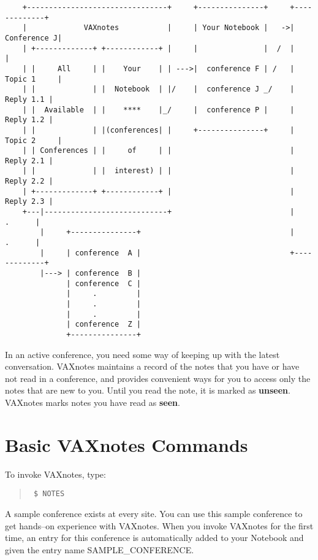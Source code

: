 \begin{verbatim}



    +--------------------------------+     +---------------+     +-------------+
    |             VAXnotes           |     | Your Notebook |   ->| Conference J|
    | +-------------+ +------------+ |     |               |  /  |             |
    | |     All     | |    Your    | | --->|  conference F | /   | Topic 1     |
    | |             | |  Notebook  | |/    |  conference J _/    |   Reply 1.1 |
    | |  Available  | |    ****    |_/     |  conference P |     |   Reply 1.2 |
    | |             | |(conferences| |     +---------------+     | Topic 2     |
    | | Conferences | |     of     | |                           |   Reply 2.1 |
    | |             | |  interest) | |                           |   Reply 2.2 |
    | +-------------+ +------------+ |                           |   Reply 2.3 |
    +---|----------------------------+                           |      .      |
        |     +---------------+                                  |      .      |
        |     | conference  A |                                  +-------------+
        |---> | conference  B |
              | conference  C |
              |     .         |
              |     .         |
              |     .         |
              | conference  Z |
              +---------------+

\end{verbatim}

In an active conference, you need some way of keeping up with the latest
conversation. VAXnotes maintains a record of the notes that you have or
have not read in a conference, and provides convenient ways for you to 
access only the notes that are new to you. Until you read the note, it
is marked as {\bf unseen}. VAXnotes marks notes you have read as {\bf seen}.

\section {Basic VAXnotes Commands}

To invoke VAXnotes, type:

\begin{quote}\tt
\$ NOTES
\end{quote}

A sample conference exists at every site. You can use this sample
conference to get hands--on experience with VAXnotes. When you invoke
VAXnotes for the first time, an entry for this conference is automatically
added to your Notebook and given the entry name SAMPLE\_CONFERENCE.

